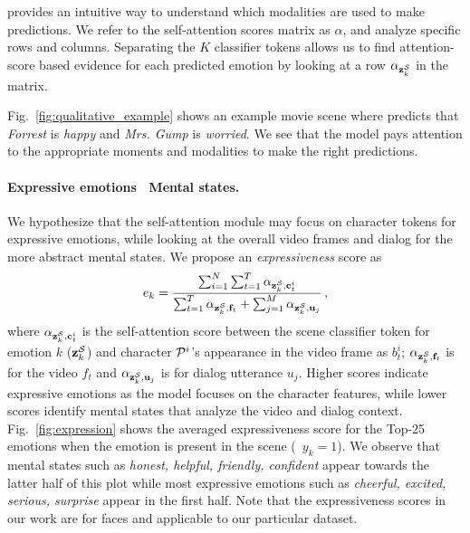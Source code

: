 \modelname{} provides an intuitive way to understand which modalities are used to make predictions.
We refer to the self-attention scores matrix as $\alpha$, and analyze specific rows and columns.
Separating the $K$ classifier tokens allows us to find attention-score based evidence for each predicted emotion by looking at a row $\alpha_{\mathbf{z}_k^{\mathcal{S}}}$ in the matrix.

Fig.~\ref{fig:qualitative_example} shows an example movie scene where \modelname{} predicts that \emph{Forrest} is \emph{happy} and \emph{Mrs. Gump} is \emph{worried}.
We see that the model pays attention to the appropriate moments and modalities to make the right predictions.

\paragraph{Expressive emotions \vs~Mental states.}
We hypothesize that the self-attention module may focus on character tokens for expressive emotions, while looking at the overall video frames and dialog for the more abstract mental states.
We propose an \emph{expressiveness} score as
\begin{equation}
e_k = \dfrac{ \sum_{i=1}^{N} \sum_{t=1}^{T} \alpha_{\mathbf{z}_k^{\mathcal{S}}, \mathbf{c}_t^i} }
{ \sum_{t=1}^{T} \alpha_{\mathbf{z}_k^{\mathcal{S}}, \mathbf{f}_t} + \sum_{j=1}^{M} \alpha_{\mathbf{z}_k^{\mathcal{S}}, \mathbf{u}_j} } \, ,
\end{equation}
where $\alpha_{\mathbf{z}_k^{\mathcal{S}}, \mathbf{c}_t^i}$ is the self-attention score between the scene classifier token for emotion $k$ ($\mathbf{z}_k^{\mathcal{S}}$) and character $\mathcal{P}^i$'s appearance in the video frame as $b_t^i$;
$\alpha_{\mathbf{z}_k^{\mathcal{S}}, \mathbf{f}_t}$ is for the video $f_t$ and
$\alpha_{\mathbf{z}_k^{\mathcal{S}}, \mathbf{u}_j}$ is for dialog utterance $u_j$.
Higher scores indicate expressive emotions as the model focuses on the character features, while lower scores identify mental states that analyze the video and dialog context.
Fig.~\ref{fig:expression} shows the averaged expressiveness score for the Top-25 emotions when the emotion is present in the scene (\ie~$y_k{=}1$).
We observe that mental states such as \emph{honest, helpful, friendly, confident} appear towards the latter half of this plot while most expressive emotions such as \emph{cheerful, excited, serious, surprise} appear in the first half.
Note that the expressiveness scores in our work are for faces and applicable to our particular dataset.
